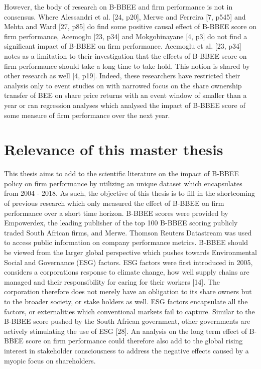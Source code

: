 However, the body of research on B-BBEE and firm performance is not in consensus. Where Alessandri et al. [24, p20], Merwe and Ferreira [7, p545] and Mehta and Ward [27, p85] do find some positive causal effect of B-BBEE score on firm performance, Acemoglu [23, p34] and Mokgobinayane [4, p3] do not find a significant impact of B-BBEE on firm performance. Acemoglu et al. [23, p34] notes as a limitation to their investigation that the effects of B-BBEE score on firm performance should take a long time to take hold. This notion is shared by other research as well [4, p19].  Indeed, these researchers have restricted their analysis only to event studies on with narrowed focus on the share ownership transfer of BEE on share price returns with an event window of smaller than a year or ran regression analyses which analysed the impact of B-BBEE score of some measure of firm performance over the next year.
\section{Relevance of this master thesis}
This thesis aims to add to the scientific literature on the impact of B-BBEE policy on firm performance by utilizing an unique dataset which encapsulates from 2004 - 2018. As such, the objective of this thesis is to fill in the shortcoming of previous research which only measured the effect of B-BBEE on firm performance over a short time horizon. B-BBEE scores were provided by Empowerdex, the leading publisher of the top 100 B-BBEE scoring publicly traded South African firms, and Merwe. Thomson Reuters Datastream was used to access public information on company performance metrics. B-BBEE should be viewed from the larger global perspective which pushes towards Environmental Social and Governance (ESG) factors. ESG factors were first introduced in 2005, considers a corporations response to climate change, how well supply chains are managed and their responsibility for caring for their workers [14]. The corporation therefore does not merely have an obligation to its share owners but to the broader society, or stake holders as well. ESG factors encapsulate all the factors, or externalities which conventional markets fail to capture. Similar to the B-BBEE score pushed by the South African government, other governments are actively stimulating the use of ESG [28]. An analysis on the long term effect of B-BBEE score on firm performance could therefore also add to the global rising interest in stakeholder consciousness to address the negative effects caused by a myopic focus on shareholders.
